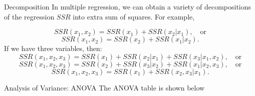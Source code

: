 \documentclass[
  ignorenonframetext,
]{beamer}
\begin{document}
\begin{frame}{Decomposition}
\protect\hypertarget{decomposition}{}
In multiple regression, we can obtain a variety of decompositions of the
regression \(SSR\) into extra sum of squares. For example,

\[SSR(x_1, x_2)=SSR(x_1)+SSR(x_2|x_1), \quad \text{or}\]
\[SSR(x_1, x_2)=SSR(x_2)+SSR(x_1|x_2).\] If we have three variables,
then:
\[SSR(x_1, x_2,x_3)=SSR(x_1)+SSR(x_2|x_1)+SSR(x_3|x_1,x_2), \quad \text{or}\]
\[SSR(x_1, x_2,x_3)=SSR(x_2)+SSR(x_3|x_2)+SSR(x_1|x_2,x_3), \quad \text{or}\]
\[SSR(x_1, x_2,x_3)=SSR(x_1)+SSR(x_2,x_3|x_1).\]
\end{frame}

\begin{frame}{Analysis of Variance: ANOVA}
\protect\hypertarget{analysis-of-variance-anova}{}
The ANOVA table is shown below

\begin{table}[h]
\centering
{}
\end{table}
\end{frame}
\end{document}

